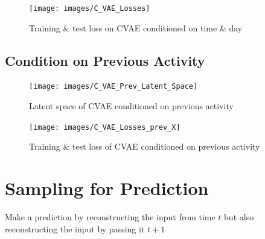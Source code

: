  \begin{figure}[htbp]
     \centering
     \texttt{[image: images/C\_VAE\_Losses]}
     \caption{Training \& test loss on CVAE conditioned on time \& day}
     \label{fig:cvae_loss}
 \end{figure}


 \subsection{Condition on Previous Activity}
 \begin{figure}[htbp]
     \centering
     \texttt{[image: images/C\_VAE\_Prev\_Latent\_Space]}
     \caption{Latent space of CVAE conditioned on previous activity}
     \label{fig:prev_cvae_latent}
 \end{figure}

 \begin{figure}[htbp]
     \centering
     \texttt{[image: images/C\_VAE\_Losses\_prev\_X]}
     \caption{Training \& test loss of CVAE conditioned on previous activity}
     \label{fig:prev_cvae_losses}
 \end{figure}

\section{Sampling for Prediction}
Make a prediction by reconstructing the input from time $t$ but also reconstructing the input by passing it $t+1$